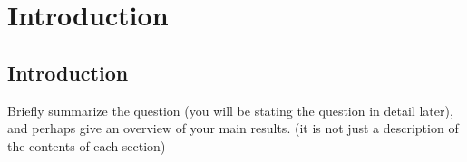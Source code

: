 


\chapter{Introduction}

\ifpdf
    \graphicspath{{1_introduction/figures/PNG/}{1_introduction/figures/PDF/}{1_introduction/figures/}}
\else
    \graphicspath{{1_introduction/figures/EPS/}{1_introduction/figures/}}
\fi







\section{Introduction} %
Briefly summarize the question (you will be stating the question in detail later), and perhaps give an overview of your main results. (it is not just a description of the contents of each section)


